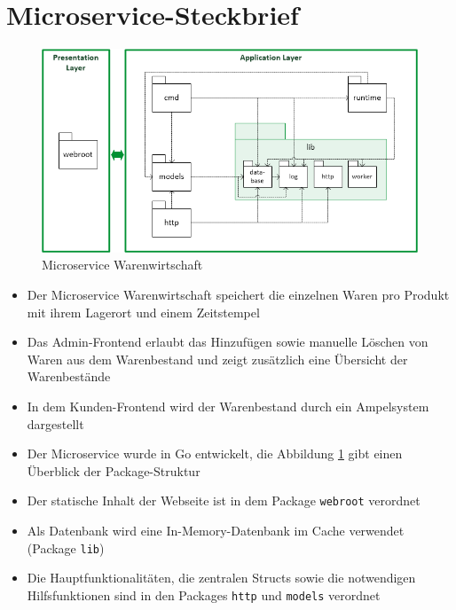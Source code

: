 \section{Microservice-Steckbrief}
\label{sec: Microservice-Steckbrief}

\begin{figure}[H]
	\begin{center}
	\includegraphics[width=0.65 \textwidth]{./pics/struktur.png}
	\end{center}
	\caption{Microservice Warenwirtschaft}
	\label{pic: Microservice Warenwirtschaft}
\end{figure}


\begin{itemize}
	\item Der Microservice Warenwirtschaft speichert die einzelnen Waren pro Produkt mit ihrem Lagerort und einem Zeitstempel
	\item Das Admin-Frontend erlaubt das Hinzufügen sowie manuelle Löschen von Waren aus dem Warenbestand und zeigt zusätzlich eine Übersicht der Warenbestände
	\item In dem Kunden-Frontend wird der Warenbestand durch ein Ampelsystem dargestellt
	\item Der Microservice wurde in Go entwickelt, die Abbildung \ref{pic: Microservice Warenwirtschaft} gibt einen Überblick der Package-Struktur
	\item Der statische Inhalt der Webseite ist in dem Package \texttt{webroot} verordnet
	\item Als Datenbank wird eine In-Memory-Datenbank im Cache verwendet (Package \texttt{lib})
	\item Die Hauptfunktionalitäten, die zentralen Structs sowie die notwendigen Hilfsfunktionen sind in den Packages \texttt{http} und \texttt{models} verordnet
\end{itemize}

